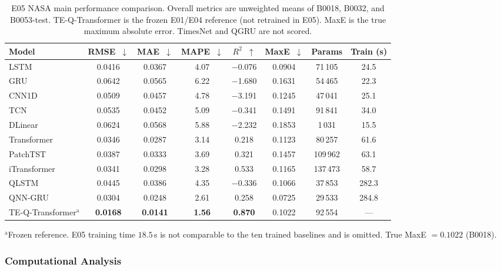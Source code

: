 \documentclass[a4paper,fleqn]{cas-sc}
\begin{document}
\begin{table}[t]
\centering
\caption{E05 NASA main performance comparison. Overall metrics are unweighted means of B0018, B0032, and B0053-test. TE-Q-Transformer is the frozen E01/E04 reference (not retrained in E05). MaxE is the true maximum absolute error. TimesNet and QGRU are not scored.}\label{tab:main_benchmark}
\footnotesize
\begin{tabular}{@{}lccccccc@{}}
\toprule
Model & RMSE~$\downarrow$ & MAE~$\downarrow$ & MAPE~$\downarrow$ & $R^2$~$\uparrow$ & MaxE~$\downarrow$ & Params & Train (s) \\
\midrule
LSTM & 0.0416 & 0.0367 & 4.07 & $-$0.076 & 0.0904 & 71\,105 & 24.5 \\
GRU & 0.0642 & 0.0565 & 6.22 & $-$1.680 & 0.1631 & 54\,465 & 22.3 \\
CNN1D & 0.0509 & 0.0457 & 4.78 & $-$3.191 & 0.1245 & 47\,041 & 25.1 \\
TCN & 0.0535 & 0.0452 & 5.09 & $-$0.341 & 0.1491 & 91\,841 & 34.0 \\
DLinear & 0.0624 & 0.0568 & 5.88 & $-$2.232 & 0.1853 & 1\,031 & 15.5 \\
Transformer & 0.0346 & 0.0287 & 3.14 & 0.218 & 0.1123 & 80\,257 & 61.6 \\
PatchTST & 0.0387 & 0.0333 & 3.69 & 0.321 & 0.1457 & 109\,962 & 63.1 \\
iTransformer & 0.0341 & 0.0298 & 3.28 & 0.533 & 0.1165 & 137\,473 & 58.7 \\
QLSTM & 0.0445 & 0.0386 & 4.35 & $-$0.336 & 0.1066 & 37\,853 & 282.3 \\
QNN-GRU & 0.0304 & 0.0248 & 2.61 & 0.258 & 0.0725 & 29\,533 & 284.8 \\
TE-Q-Transformer$^{\mathrm{a}}$ & \textbf{0.0168} & \textbf{0.0141} & \textbf{1.56} & \textbf{0.870} & 0.1022 & 92\,554 & --- \\
\bottomrule
\end{tabular}
\vspace{2pt}
\begin{minipage}{\textwidth}
\footnotesize $^{\mathrm{a}}$Frozen reference. E05 training time $18.5$\,s is not comparable to the ten trained baselines and is omitted. True MaxE $=0.1022$ (B0018).
\end{minipage}
\end{table}

\subsubsection{Computational Analysis}
\label{sec:computational_analysis}
\end{document}
